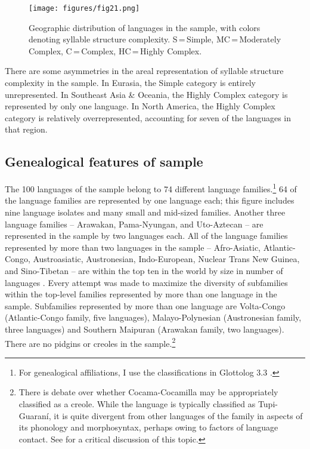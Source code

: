 \begin{figure}
\texttt{[image: figures/fig21.png]}
\caption{\label{fig:2.1}Geographic distribution of languages in the sample, with colors denoting syllable structure complexity. S\,=\,Simple, MC\,=\,Moderately Complex, C\,=\,Complex, HC\,=\,Highly Complex.}
\end{figure}

  There are some asymmetries in the areal representation of syllable structure complexity in the sample. In Eurasia, the Simple category is entirely unrepresented. In Southeast Asia \& Oceania, the Highly Complex category is represented by only one language. In North America, the Highly Complex category is relatively overrepresented, accounting for seven of the languages in that region.

\subsection{Genealogical features of sample}\label{sec:2.4.2}

  The 100 languages of the sample belong to 74 different language families.\footnote{{For genealogical affiliations, I use the classifications in Glottolog 3.3 \citep{HammarströmEtAl2018}.}} 64 of the language families are represented by one language each; this figure includes nine language isolates and many small and mid-sized families. Another three language families -- Arawakan, Pama-Nyungan, and Uto-Aztecan -- are represented in the sample by two languages each. All of the language families represented by more than two languages in the sample -- Afro-Asiatic, Atlantic-Congo, Austroasiatic, Austronesian, Indo-European, Nuclear Trans New Guinea, and Sino-Tibetan -- are within the top ten in the world by size in number of languages \citep{HammarströmEtAl2018}. Every attempt was made to maximize the diversity of subfamilies within the top-level families represented by more than one language in the sample. Subfamilies represented by more than one language are Volta-Congo (Atlantic-Congo family, five languages), Malayo-Polynesian (Austronesian family, three languages) and Southern Maipuran (Arawakan family, two languages). There are no pidgins or creoles in the sample.\footnote{{There is debate over whether Cocama-Cocamilla may be appropriately classified as a creole. While the language is typically classified as Tupi-Guaraní, it is quite divergent from other languages of the family in aspects of its phonology and morphosyntax, perhaps owing to factors of language contact. See  \citet{VallejosYopán2010} for a critical discussion of this topic.}}

